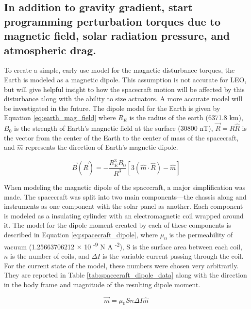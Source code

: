 \subsection{In addition to gravity gradient, start programming perturbation torques due to magnetic field, solar radiation pressure, and atmospheric drag.}

To create a simple, early use model for the magnetic disturbance torques, the Earth is modeled as a magnetic dipole. This assumption is not accurate for LEO, but will give helpful insight to how the spacecraft motion will be affected by this disturbance along with the ability to size actuators. A more accurate model will be investigated in the future. The dipole model for the Earth is given by Equation \ref{eq:earth_mag_field} where $R_E$ is the radius of the earth (6371.8 km), $B_0$ is the strength of Earth's magnetic field at the surface (30800 nT), $\vec{R} = R \hat{R}$ is the vector from the center of the Earth to the center of mass of the spacecraft, and $\hat{m}$ represents the direction of Earth's magnetic dipole.

\begin{equation} \label{eq:earth_mag_field}
    \vec{B}(\vec{R}) = -\frac{R_E^3 B_0}{R^3} \left[ 3\left( \hat{m} \cdot \hat{R} \right) - \hat{m} \right]
\end{equation}

When modeling the magnetic dipole of the spacecraft, a major simplification was made. The spacecraft was split into two main components---the chassis along and instruments as one component with the solar panel as another. Each component is modeled as a insulating cylinder with an electromagnetic coil wrapped around it. The model for the dipole moment created by each of these components is described in Equation \ref{eq:spacecraft_dipole}, where $\mu_0$ is the permeability of vacuum (1.25663706212 $\times$ 10 \textsuperscript{-9} N A \textsuperscript{-2}), S is the surface area between each coil, $n$ is the number of coils, and $\Delta I$ is the variable current passing through the coil. For the current state of the model, these numbers were chosen very arbitrarily. They are reported in Table \ref{tab:spacecraft_dipole_data} along with the direction in the body frame and magnitude of the resulting dipole moment.

\begin{equation} \label{eq:spacecraft_dipole}
    \vec{m} = \mu_0 S n \Delta I \hat{m}
\end{equation}

